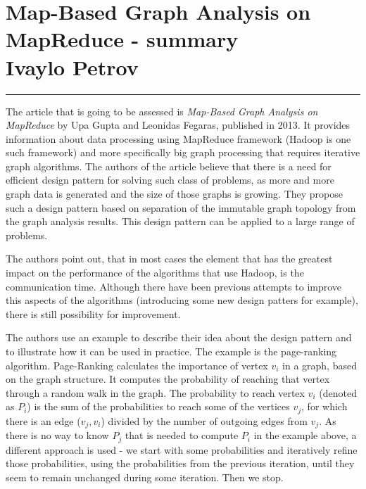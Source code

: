 \documentclass[12pt]{article}
\newcommand{\hr}{\rule{\linewidth}{0.1mm}}
\theoremstyle{plain}
\begin{document}
\section*{\centering
  Map-Based Graph Analysis on MapReduce - summary \\
  Ivaylo Petrov 
}

\hr

The article that is going to be assessed is \emph{Map-Based Graph Analysis on
MapReduce} by Upa Gupta and Leonidas Fegaras, published in 2013. It provides
information about data processing using MapReduce framework (Hadoop is one such
framework) and more specifically big graph processing that requires iterative
graph algorithms. The authors of the article believe that there is a need for
efficient design pattern for solving such class of problems, as more and more
graph data is generated and the size of those graphs is growing. They propose
such a design pattern based on separation of the immutable graph topology from
the graph analysis results. This design pattern can be applied to a large range
of problems.  

  The authors point out, that in most cases the element that has the greatest
  impact on the performance of the algorithms that use Hadoop, is the
  communication time. Although there have been previous attempts to improve
  this aspects of the algorithms (introducing some new design patters for
  example), there is still possibility for improvement.  

  The authors use an example to describe their idea about the design pattern
  and to illustrate how it can be used in practice. The example is the
  page-ranking algorithm. Page-Ranking calculates the importance of vertex
  $v_i$ in a graph, based on the graph structure. It computes the probability
  of reaching that vertex through a random walk in the graph. The probability
  to reach vertex $v_i$ (denoted as $P_i$) is the sum of the probabilities to
  reach some of the vertices $v_j$, for which there is an edge ($v_j, v_i$)
  divided by the number of outgoing edges from $v_j$. As there is no way to
  know $P_j$ that is needed to compute $P_i$ in the example above, a different
  approach is used - we start with some probabilities and iteratively refine
  those probabilities, using the probabilities from the previous iteration,
  until they seem to remain unchanged during some iteration. Then we stop.
  
\end{document}
